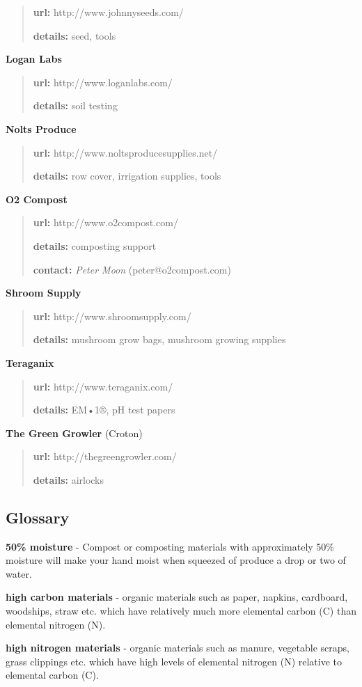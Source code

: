 \begin{quote}
\textbf{url:} http://www.johnnyseeds.com/

\textbf{details:} seed, tools
\end{quote}

\textbf{Logan Labs}

\begin{quote}
\textbf{url:} http://www.loganlabs.com/

\textbf{details:} soil testing
\end{quote}

\textbf{Nolts Produce}

\begin{quote}
\textbf{url:} http://www.noltsproducesupplies.net/

\textbf{details:} row cover, irrigation supplies, tools
\end{quote}

\textbf{O2 Compost}

\begin{quote}
\textbf{url:} http://www.o2compost.com/

\textbf{details:} composting support

\textbf{contact:} \emph{Peter Moon} (peter@o2compost.com)
\end{quote}

\textbf{Shroom Supply}

\begin{quote}
\textbf{url:} http://www.shroomsupply.com/

\textbf{details:} mushroom grow bags, mushroom growing supplies
\end{quote}

\textbf{Teraganix}

\begin{quote}
\textbf{url:} http://www.teraganix.com/

\textbf{details:} EM•1®, pH test papers
\end{quote}

\textbf{The Green Growler} (Croton)

\begin{quote}
\textbf{url:} http://thegreengrowler.com/

\textbf{details:} airlocks
\end{quote}

\subsection{Glossary}\label{glossary}

\textbf{50\% moisture} - Compost or composting materials with
approximately 50\% moisture will make your hand moist when squeezed of
produce a drop or two of water.

\textbf{high carbon materials} - organic materials such as paper,
napkins, cardboard, woodships, straw etc. which have relatively much
more elemental carbon (C) than elemental nitrogen (N).

\textbf{high nitrogen materials} - organic materials such as manure,
vegetable scraps, grass clippings etc. which have high levels of
elemental nitrogen (N) relative to elemental carbon (C).
